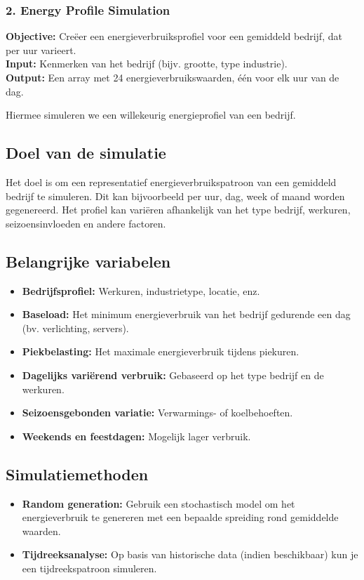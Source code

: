 \FloatBarrier  %

\subsubsection{2. Energy Profile Simulation}

\textbf{Objective:} Creëer een energieverbruiksprofiel voor een gemiddeld bedrijf, dat per uur varieert. \\
\textbf{Input:} Kenmerken van het bedrijf (bijv. grootte, type industrie). \\
\textbf{Output:} Een array met 24 energieverbruikswaarden, één voor elk uur van de dag.

Hiermee simuleren we een willekeurig energieprofiel van een bedrijf. 

\subsection{Doel van de simulatie}
Het doel is om een representatief energieverbruikspatroon van een gemiddeld bedrijf te simuleren. Dit kan bijvoorbeeld per uur, dag, week of maand worden gegenereerd. Het profiel kan variëren afhankelijk van het type bedrijf, werkuren, seizoensinvloeden en andere factoren.

\subsection{Belangrijke variabelen}
\begin{itemize}
    \item \textbf{Bedrijfsprofiel:} Werkuren, industrietype, locatie, enz.
    \item \textbf{Baseload:} Het minimum energieverbruik van het bedrijf gedurende een dag (bv. verlichting, servers).
    \item \textbf{Piekbelasting:} Het maximale energieverbruik tijdens piekuren.
    \item \textbf{Dagelijks variërend verbruik:} Gebaseerd op het type bedrijf en de werkuren.
    \item \textbf{Seizoensgebonden variatie:} Verwarmings- of koelbehoeften.
    \item \textbf{Weekends en feestdagen:} Mogelijk lager verbruik.
\end{itemize}

\subsection{Simulatiemethoden}
\begin{itemize}
    \item \textbf{Random generation:} Gebruik een stochastisch model om het energieverbruik te genereren met een bepaalde spreiding rond gemiddelde waarden.
    \item \textbf{Tijdreeksanalyse:} Op basis van historische data (indien beschikbaar) kun je een tijdreekspatroon simuleren.
\end{itemize}

